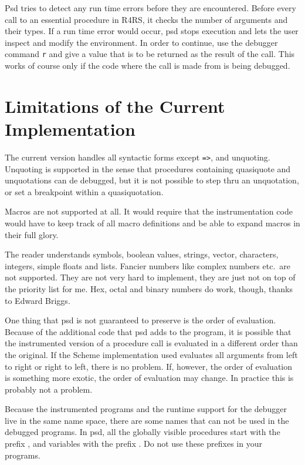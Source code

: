 Psd tries to detect any run time errors before they are encountered.
Before every call to an essential procedure in R4RS, it checks the
number of arguments and their types. If a run time error would occur,
psd stops execution and lets the user inspect and modify the
environment. In order to continue, use the debugger command {\tt r}
and give a value that is to be returned as the result of the call.
This works of course only if the code where the call is made from is
being debugged.
 
\section{Limitations of the Current Implementation}
\label{sec:implementlimitations}

The current version handles all syntactic forms except \verb|=>|,
 and unquoting. Unquoting is supported
in the sense that procedures containing quasiquote and unquotations
can de debugged, but it is not possible to step thru an unquotation,
or set a breakpoint within a quasiquotation.

Macros are not supported at all. It would require that the
instrumentation code would have to keep track of all macro definitions
and be able to expand macros in their full glory.


The reader understands symbols, boolean values, strings, vector,
characters, integers, simple floats and lists.  Fancier numbers like
complex numbers etc.\ are not supported. They
are not very hard to implement, they are just not on top of the
priority list for me. Hex, octal and binary numbers do work, though,
thanks to Edward Briggs.

One thing that psd is not guaranteed to preserve is the order of
evaluation. Because of the additional code that psd adds to the
program, it is possible that the instrumented version of a procedure
call is evaluated in a different order than the original. If the
Scheme implementation used evaluates all arguments from left to right
or right to left, there is no problem. If, however, the order of
evaluation is something more exotic, the order of evaluation may
change.  In practice this is probably not a problem.

Because the instrumented programs and the runtime support for the
debugger live in the same name space, there are some names that can
not be used in the debugged programs. In psd, all the globally visible
procedures start with the prefix , and  variables with
the prefix . Do not use these prefixes in your programs.

